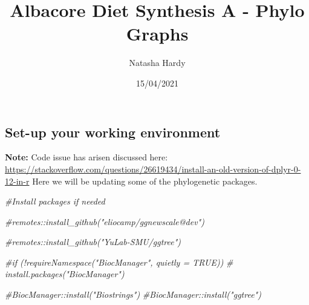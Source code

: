 \documentclass[
]{article}
\title{Albacore Diet Synthesis A - Phylo Graphs}
\author{Natasha Hardy}
\date{15/04/2021}
\newenvironment{Shaded}{\begin{snugshade}}{\end{snugshade}}
\newcommand{\CommentTok}[1]{\textcolor[rgb]{0.56,0.35,0.01}{\textit{#1}}}
\begin{document}
\maketitle

\hypertarget{set-up-your-working-environment}{%
\subsection{Set-up your working
environment}\label{set-up-your-working-environment}}

\textbf{Note:} Code issue has arisen discussed here:
\url{https://stackoverflow.com/questions/26619434/install-an-old-version-of-dplyr-0-12-in-r}
Here we will be updating some of the phylogenetic packages.

\begin{Shaded}
\begin{Highlighting}[]
\CommentTok{\#Install packages if needed}

\CommentTok{\#remotes::install\_github("eliocamp/ggnewscale@dev")}

\CommentTok{\#remotes::install\_github("YuLab{-}SMU/ggtree")}

\CommentTok{\#if (!requireNamespace("BiocManager", quietly = TRUE))}
\CommentTok{\#    install.packages("BiocManager")}

\CommentTok{\#BiocManager::install("Biostrings")}
\CommentTok{\#BiocManager::install("ggtree")}
\end{Highlighting}
\end{Shaded}
\end{document}
